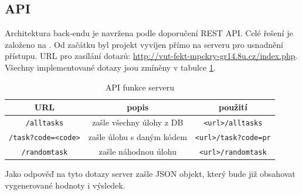 \documentclass[titlepage]{article}
\begin{document}
 \subsection{API}
Architektura back-endu je navržena podle doporučení REST API. Celé řešení je založeno na \cite{restapi}. Od začátku byl projekt vyvíjen přímo na serveru pro usnadnění přístupu. URL pro zasílání dotazů: \url{http://vut-fekt-mpckry-gr14.8u.cz/index.php}. Všechny implementované dotazy jsou zmíněny v tabulce \ref{tab:api}.
\begin{table}[h!]
    \centering
    \caption{API funkce serveru} 
    \label{tab:api}
    \vspace{.5em}
    \begin{tabular}{|c|c|c|}
        \hline
        \textbf{URL} & \textbf{popis} & \textbf{použití} \\
        \hline \hline
        \texttt{/alltasks} & zašle všechny úlohy z DB & \texttt{<url>/alltasks} \\
        \hline
        \texttt{/task?code=<code>} &zašle úlohu s daným kódem & \texttt{<url>/task?code=pr} \\
        \hline
        \texttt{/randomtask} & zašle náhodnou úlohu & \texttt{<url>/randomtask}\\
        \hline
    \end{tabular}
\end{table}

Jako odpověď na tyto dotazy server zašle JSON objekt, který bude již obsahovat vygenerované hodnoty i výsledek. 
\end{document}
